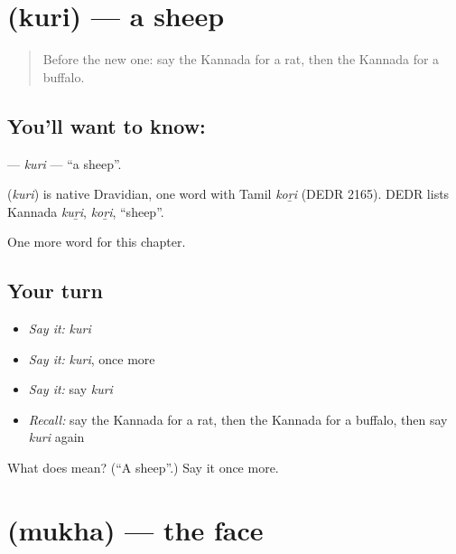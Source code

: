 \section[\texorpdfstring{\kn{ಕುರಿ} (kuri)}{ಕುರಿ (kuri)}]{ (kuri) — a sheep}

\label{lesson:KA-C134-kuri}



\begin{quote}
Before the new one: say the Kannada for a rat, then the Kannada for a buffalo.
\end{quote}

\subsection*{You'll want to know: }
\textbf{} — \emph{kuri} — \textquotedblleft{}a sheep\textquotedblright{}.

\begin{cousinweb}
\textbf{} (\emph{kuri}) is native Dravidian, one word with Tamil \emph{koṟi} (DEDR 2165). DEDR lists Kannada \emph{kuṟi}, \emph{koṟi}, \textquotedblleft{}sheep\textquotedblright{}.
\end{cousinweb}

\begin{grammarlens}[title={What you've built}]
One more word for this chapter.
\end{grammarlens}

\subsection*{Your turn}
\begin{itemize}
\raggedright
  \item \emph{Say it:} \emph{kuri}
  \item \emph{Say it:} \emph{kuri}, once more
  \item \emph{Say it:} say \emph{kuri}
  \item \emph{Recall:} say the Kannada for a rat, then the Kannada for a buffalo, then say \emph{kuri} again
\end{itemize}

\begin{tcolorbox}[breakable,colback=teal!4,colframe=teal!35!black,title={Before you move on}]
What does  mean? (\textquotedblleft{}A sheep\textquotedblright{}.) Say it once more.
\end{tcolorbox}
\section[\texorpdfstring{\kn{ಮುಖ} (mukha)}{ಮುಖ (mukha)}]{ (mukha) — the face}

